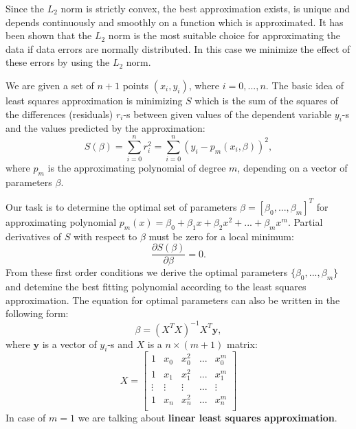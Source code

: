 \documentclass[a4paper,10pt]{article}
\begin{document}
Since the $L_2$ norm is strictly convex, the best approximation exists, is unique and depends continuously and smoothly on a function which
is approximated. It has been shown that the $L_2$ norm is the most suitable choice
for approximating the data if data errors are normally distributed. In this case  we minimize the effect of these errors by using the $L_2$ norm. \cite{tomislav}

We are given a set of $n+1$ points $(x_i,y_i)$, where $i=0,...,n$. The basic idea of least squares approximation is minimizing $S$ which is the sum of the squares of the differences (residuals) $r_i$-s
between given values of the dependent variable $y_i$-s and the values
predicted by the approximation: $$S(\beta)=\sum_{i=0}^{n}r_i^2=\sum_{i=0}^{n}(y_i-p_m(x_i,\beta))^2,$$ where $p_m$ is the approximating polynomial of degree $m$, depending on a vector of parameters $\beta$.

Our task is to determine the optimal set of parameters $\beta=[\beta_0,...,\beta_m]^T$ for approximating polynomial $p_m(x)=\beta_0+\beta_1x+\beta_2x^2+...+\beta_mx^m$.
Partial derivatives of $S$ with respect to $\beta$ must be zero for a local minimum: $$\frac{\partial S(\beta)}{\partial \beta}=0.$$ From these first order conditions we derive the optimal parameters $\{\beta_0,...,\beta_m\}$ and detemine the best fitting polynomial according to the least squares approximation.
The equation for optimal parameters can also be written in the following form: $$\beta=(X^TX)^{-1}X^T\textbf{y},$$ where $\textbf{y}$ is a vector of $y_i$-s and $X$ is a $n \times (m+1)$ matrix:
\[
X=
  \begin{bmatrix}
    1 & x_0 & x_0^2 & ... & x_0^m \\
    1 & x_1 & x_1^2 & ... & x_1^m \\
\vdots & \vdots &\vdots & ... & \vdots \\
1 & x_n & x_n^2 & ... & x_n^m \\
  \end{bmatrix}
\]
In case of $m=1$ we are talking about \textbf{linear least squares approximation}. \cite{marjetka}
\end{document}
